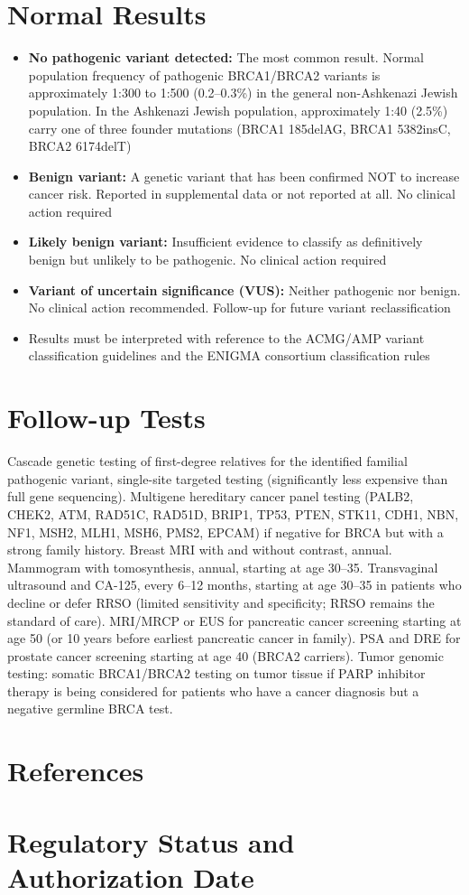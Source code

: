 \section*{Normal Results}
\begin{itemize}
  \item \textbf{No pathogenic variant detected:} The most common result. Normal population frequency of pathogenic BRCA1/BRCA2 variants is approximately 1:300 to 1:500 (0.2--0.3\%) in the general non-Ashkenazi Jewish population. In the Ashkenazi Jewish population, approximately 1:40 (2.5\%) carry one of three founder mutations (BRCA1 185delAG, BRCA1 5382insC, BRCA2 6174delT)
  \item \textbf{Benign variant:} A genetic variant that has been confirmed NOT to increase cancer risk. Reported in supplemental data or not reported at all. No clinical action required
  \item \textbf{Likely benign variant:} Insufficient evidence to classify as definitively benign but unlikely to be pathogenic. No clinical action required
  \item \textbf{Variant of uncertain significance (VUS):} Neither pathogenic nor benign. No clinical action recommended. Follow-up for future variant reclassification
  \item Results must be interpreted with reference to the ACMG/AMP variant classification guidelines and the ENIGMA consortium classification rules
\end{itemize}

\section*{Follow-up Tests}
Cascade genetic testing of first-degree relatives for the identified familial pathogenic variant, single-site targeted testing (significantly less expensive than full gene sequencing). Multigene hereditary cancer panel testing (PALB2, CHEK2, ATM, RAD51C, RAD51D, BRIP1, TP53, PTEN, STK11, CDH1, NBN, NF1, MSH2, MLH1, MSH6, PMS2, EPCAM) if negative for BRCA but with a strong family history. Breast MRI with and without contrast, annual. Mammogram with tomosynthesis, annual, starting at age 30--35. Transvaginal ultrasound and CA-125, every 6--12 months, starting at age 30--35 in patients who decline or defer RRSO (limited sensitivity and specificity; RRSO remains the standard of care). MRI/MRCP or EUS for pancreatic cancer screening starting at age 50 (or 10 years before earliest pancreatic cancer in family). PSA and DRE for prostate cancer screening starting at age 40 (BRCA2 carriers). Tumor genomic testing: somatic BRCA1/BRCA2 testing on tumor tissue if PARP inhibitor therapy is being considered for patients who have a cancer diagnosis but a negative germline BRCA test.

\section*{References}


\clearpage
\section*{Regulatory Status and Authorization Date}

\clearpage
